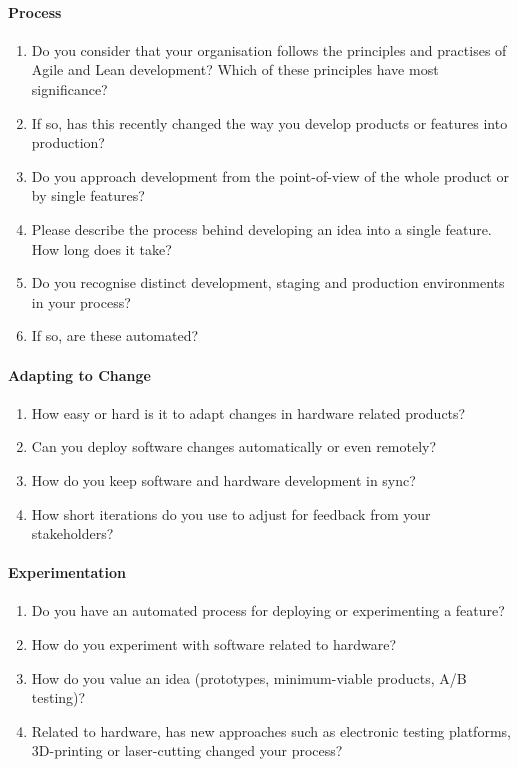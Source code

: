 \documentclass[english]{tktltiki2}
\begin{document}
\paragraph{Process}

\begin{enumerate}

    \item Do you consider that your organisation follows the principles and practises of Agile and Lean development? Which of these principles have most significance?
    \item If so, has this recently changed the way you develop products or features into production?
    \item Do you approach development from the point-of-view of the whole product or by single features?
    \item Please describe the process behind developing an idea into a single feature. How long does it take?
    \item Do you recognise distinct development, staging and production environments in your process?
    \item If so, are these automated?

\end{enumerate}

\paragraph{Adapting to Change}

\begin{enumerate}[resume]

    \item How easy or hard is it to adapt changes in hardware related products?
    \item Can you deploy software changes automatically or even remotely?
    \item How do you keep software and hardware development in sync?
    \item How short iterations do you use to adjust for feedback from your stakeholders?

\end{enumerate}

\paragraph{Experimentation}

\begin{enumerate}[resume]

    \item Do you have an automated process for deploying or experimenting a feature?
    \item How do you experiment with software related to hardware?
    \item How do you value an idea (prototypes, minimum-viable products, A/B testing)?
    \item Related to hardware, has new approaches such as electronic testing platforms, 3D-printing or laser-cutting changed your process?

\end{enumerate}
\end{document}

